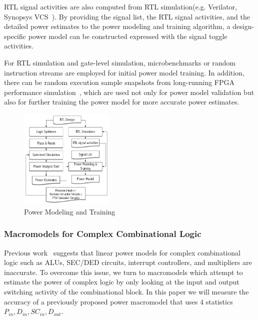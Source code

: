RTL signal activities are also computed from RTL simulation(e.g. Verilator, Synopsys VCS~\textregistered).
By providing the signal list, the RTL signal activities, and the detailed power estimates
to the power modeling and training algorithm, a design-specific power model can be constructed
expressed with the signal toggle activities.

For RTL simulation and gate-level simulation, microbenchmarks or random instruction streams are employed
for initial power model training. In addition, there can be random execution sample snapshots from
long-running FPGA performance simulation~\cite{Kim2016}, which are used not only for power model validation
but also for further training the power model for more accurate power estimates.

\begin{figure}[!ht]
	\centering
	\includegraphics[width=0.4\textwidth,height=\textheight,keepaspectratio]{images/power_modeling.pdf}
	\caption{Power Modeling and Training}
	\label{fig:power_modeling}
\end{figure}

\subsubsection{Macromodels for Complex Combinational Logic}
Previous work~\cite{Sunwoo2010} suggests that linear power models for complex combinational logic such as ALUs, SEC/DED circuits, interrupt controllers, and multipliers are inaccurate. To overcome this issue, we turn to macromodels which attempt to estimate the power of complex logic by only looking at the input and output switching activity of the combinational block. In this paper we will measure the accuracy of a previously proposed power macromodel that uses 4 statistics $P_{in}, D_{in}, SC_{in}, D_{out}$.~\cite{Najm2000}\cite{Najm2000_2}

